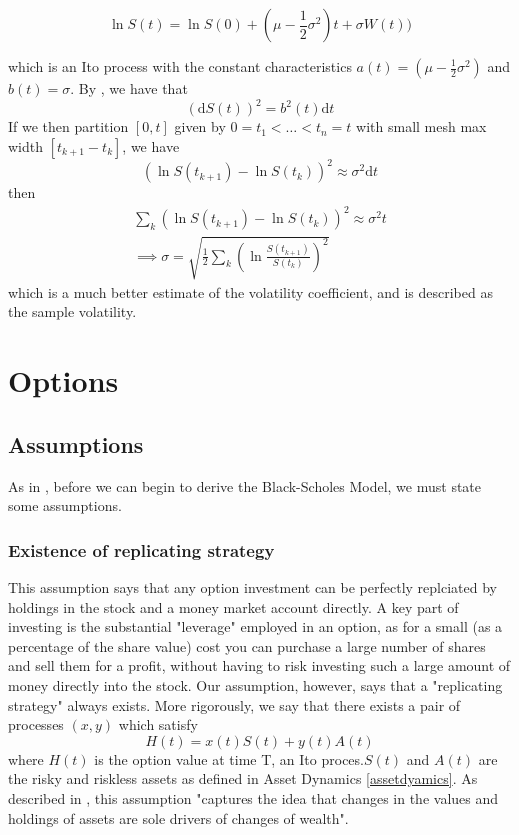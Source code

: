 \documentclass[11pt]{article} %
\begin{document}
\begin{equation}
    \ln{S(t)} = \ln{S(0)} + (\mu - \frac{1}{2}\sigma^2)t + \sigma W(t))
\end{equation}

which is an Ito process with the constant characteristics $a(t) = (\mu - \frac{1}{2}\sigma^2)$
 and $b(t) = \sigma$. By \cite{quadtraticvariation}, we have that
 \begin{equation}
     (\mathrm{d}S(t))^2 = b^2(t) \mathrm{d}t
 \end{equation}
 If we then partition $[0,t]$ given by $0 = t_1 < \dots < t_n = t$ with small mesh max 
 width $[t_{k+1} - t_k]$, we have 
 \begin{equation}
     (\ln{S(t_{k+1}) - \ln{S(t_k)}})^2 \approx \sigma^2 \mathrm{d}t
 \end{equation}
then 
\begin{align}
    \sum_k (\ln{S(t_{k+1}) - \ln{S(t_k)}})^2 \approx \sigma^2 t\\
    \implies
    \sigma = \sqrt{\frac{1}{2}\sum_k (\ln{\frac{S(t_{k+1})}{S(t_k)}})^2}
    \label{volatilityapprox}
\end{align}
which is a much better estimate of the volatility coefficient, and is described as the 
sample volatility.
\section{Options}
\subsection{Assumptions}

As in \cite{blackscholes}, before we can begin to derive the Black-Scholes Model, we must 
state some assumptions.
\subsubsection{Existence of replicating strategy}\label{replicatingstrategy}

This assumption says that any option investment can be perfectly replciated by holdings in 
the stock and a money market account directly. A key part of investing is the substantial 
"leverage" employed in an option, as for a small (as a percentage of the share value) cost 
you can purchase a large number of shares and sell them for a profit, without having to risk 
investing such a large amount of money directly into the stock. Our assumption, however, says 
that a "replicating strategy" always exists. More rigorously, we say that there exists a 
pair of processes $(x,y)$ which satisfy 
\begin{equation}
    H(t) = x(t)S(t) + y(t)A(t)
\end{equation}
where $H(t)$ is the option value at time T, an Ito proces.$S(t)$ and $A(t)$ are the risky 
and riskless assets as defined in Asset Dynamics \ref{assetdyamics}. 
As described in \cite{blackscholes}, this assumption "captures the idea that changes in the 
values and holdings of assets are sole drivers of changes of wealth".
\end{document}
